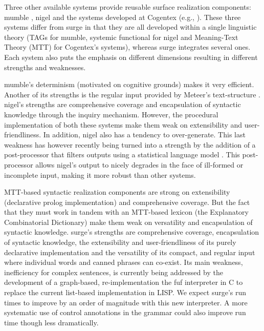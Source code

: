 Three other available systems provide reusable surface realization components:
{\sc mumble} \cite{mumble86}, {\sc nigel} \cite{matthiessen87} and the systems
developed at Cogentex (e.g., \cite{iordanskaja-et-al}). These three systems
differ from {\sc surge} in that they are all developed within a single
linguistic theory (TAGs for {\sc mumble}, systemic functional for {\sc nigel}
and Meaning-Text Theory (MTT) \cite{melcuk-pertsov} for Cogentex's systems),
whereas {\sc surge} integrates several ones. Each system also puts the emphasis
on different dimensions resulting in different strengths and weaknesses.

{\sc mumble}'s determinism (motivated on cognitive grounds) makes it very
efficient. Another of its strengths is the regular input provided by
Meteer's text-structure \cite{meteer-book}. {\sc nigel}'s strengths are
comprehensive coverage and encapsulation of syntactic knowledge through the
inquiry mechanism.  However, the procedural implementation of both these
systems make them weak on extensibility and user-friendliness. In addition,
{\sc nigel} also has a tendency to over-generate. This last weakness has
however recently being turned into a strength by the addition of a
post-processor that filters outputs using a statistical language model
\cite{knight-vh}. This post-processor allows {\sc nigel}'s output to nicely
degrades in the face of ill-formed or incomplete input, making it more
robust than other systems.

MTT-based syntactic realization components are strong on extensibility
(declarative {\sc prolog} implementation) and comprehensive coverage. But the
fact that they must work in tandem with an MTT-based lexicon (the Explanatory
Combinatorial Dictionary) make them weak on versatility and encapsulation of
syntactic knowledge. {\sc surge}'s strengths are comprehensive coverage,
encapsulation of syntactic knowledge, the extensibility and user-friendliness
of its purely declarative implementation and the versatility of its compact,
and regular input where individual words and canned phrases can co-exist.  Its
main weakness, inefficiency for complex sentences, is currently being addressed
by the development of a graph-based, re-implementation the {\sc fuf}
interpreter in C to replace the current list-based implementation in LISP. We
expect {\sc surge}'s run times to improve by an order of magnitude with this
new interpreter. A more systematic use of control annotations in the grammar
could also improve run time though less dramatically.


